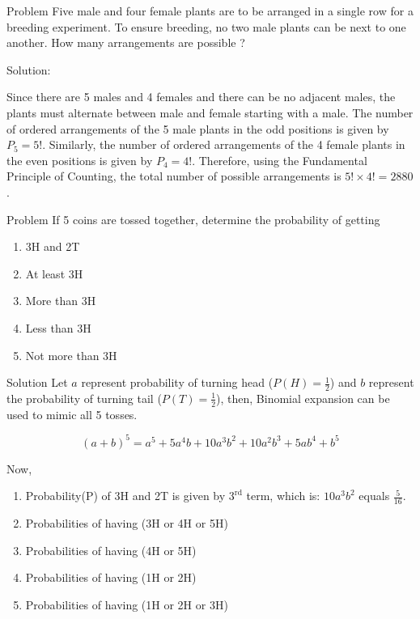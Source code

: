 \documentclass[11pt,ignorenonframetext,aspectratio=169]{beamer}
\providecommand{\tightlist}{%
  \setlength{\itemsep}{0pt}\setlength{\parskip}{0pt}}
\begin{document}
\begin{frame}{Problem}
\protect\hypertarget{problem-1}{}
Five male and four female plants are to be arranged in a single row for
a breeding experiment. To ensure breeding, no two male plants can be
next to one another. How many arrangements are possible ?

Solution:

Since there are 5 males and 4 females and there can be no adjacent
males, the plants must alternate between male and female starting with a
male. The number of ordered arrangements of the 5 male plants in the odd
positions is given by \(P_5 = 5!\). Similarly, the number of ordered
arrangements of the 4 female plants in the even positions is given by
\(P_4 = 4!\). Therefore, using the Fundamental Principle of Counting,
the total number of possible arrangements is \(5! \times 4! = 2880\).
\end{frame}

\begin{frame}{Problem}
\protect\hypertarget{problem-2}{}
If 5 coins are tossed together, determine the probability of getting

\begin{enumerate}
\tightlist
\item
  3H and 2T
\item
  At least 3H
\item
  More than 3H
\item
  Less than 3H
\item
  Not more than 3H
\end{enumerate}
\end{frame}

\begin{frame}{Solution}
\protect\hypertarget{solution}{}
Let \(a\) represent probability of turning head (\(P(H) = \frac{1}{2}\))
and \(b\) represent the probability of turning tail
(\(P(T) = \frac{1}{2}\)), then, Binomial expansion can be used to mimic
all 5 tosses.

\[
(a + b)^5 = a^5 + 5a^4b + 10 a^3 b^2 + 10 a^2 b^3 + 5 ab^4 + b^5
\]

Now,

\begin{enumerate}
\tightlist
\item
  Probability(P) of 3H and 2T is given by \(\mathrm{3^{rd}}\) term,
  which is: \(10 a^3 b^2\) equals \(\frac{5}{16}\).
\item
  Probabilities of having (3H or 4H or 5H)
\item
  Probabilities of having (4H or 5H)
\item
  Probabilities of having (1H or 2H)
\item
  Probabilities of having (1H or 2H or 3H)
\end{enumerate}
\end{frame}
\end{document}
